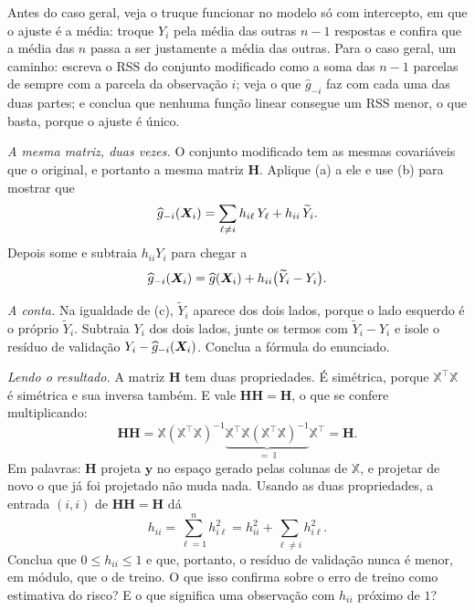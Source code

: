 \begin{itens}
        Antes do caso geral, veja o truque funcionar no modelo só com intercepto,
        em que o ajuste é a média: troque $Y_i$ pela média das outras $n-1$
        respostas e confira que a média das $n$ passa a ser justamente a média das
        outras. Para o caso geral, um caminho: escreva o RSS do conjunto modificado
        como a soma das $n-1$ parcelas de sempre com a parcela da observação $i$;
        veja o que $\widehat g_{-i}$ faz com cada uma das duas partes; e conclua
        que nenhuma função linear consegue um RSS menor, o que basta, porque o
        ajuste é único.
  \item {} \emph{A mesma matriz, duas vezes.} O conjunto modificado tem as
        mesmas covariáveis que o original, e portanto a mesma matriz $\bm H$.
        Aplique (a) a ele e use (b) para mostrar que
        \[
          \widehat g_{-i}(\bm{X}_i)=\sum_{\ell\neq i} h_{i\ell}\,Y_\ell + h_{ii}\,\widetilde Y_i .
        \]
        Depois some e subtraia $h_{ii}Y_i$ para chegar a
        \[
          \widehat g_{-i}(\bm{X}_i) = \widehat g(\bm{X}_i) + h_{ii}\big(\widetilde Y_i - Y_i\big).
        \]
  \item {} \emph{A conta.} Na igualdade de (c), $\widetilde Y_i$ aparece dos
        dois lados, porque o lado esquerdo é o próprio $\widetilde Y_i$. Subtraia
        $Y_i$ dos dois lados, junte os termos com $\widetilde Y_i-Y_i$ e isole o
        resíduo de validação $Y_i-\widehat g_{-i}(\bm{X}_i)$. Conclua a fórmula do
        enunciado.
  \item {} \emph{Lendo o resultado.} A matriz $\bm H$ tem duas propriedades.
        É simétrica, porque $\mathbb{X}^\top\mathbb{X}$ é simétrica e sua inversa
        também. E vale $\bm H\bm H=\bm H$, o que se confere multiplicando:
        \[
          \bm H\bm H
           = \mathbb{X}(\mathbb{X}^\top\mathbb{X})^{-1}
             \underbrace{\mathbb{X}^\top\mathbb{X}(\mathbb{X}^\top\mathbb{X})^{-1}}_{=\;\mathbb{I}}
             \mathbb{X}^\top
           = \bm H .
        \]
        Em palavras: $\bm H$ projeta $\bm y$ no espaço gerado pelas colunas de
        $\mathbb{X}$, e projetar de novo o que já foi projetado não muda nada.
        Usando as duas propriedades, a entrada $(i,i)$ de $\bm H\bm H=\bm H$ dá
        \[
          h_{ii}=\sum_{\ell=1}^{n} h_{i\ell}^2 = h_{ii}^2+\sum_{\ell\neq i} h_{i\ell}^2 .
        \]
        Conclua que $0\le h_{ii}\le 1$ e que, portanto, o resíduo de validação
        nunca é menor, em módulo, que o de treino. O que isso confirma sobre o erro
        de treino como estimativa do risco? E o que significa uma observação com
        $h_{ii}$ próximo de $1$?
\end{itens}

